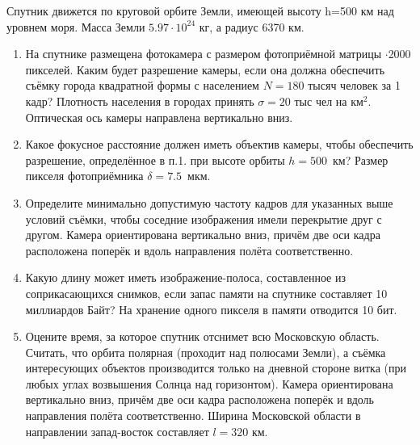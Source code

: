 
Спутник движется по круговой орбите Земли, имеющей высоту h=500 км над уровнем моря. Масса Земли 
$5.97 \cdot 10^{24}$ кг, а радиус 6370 км.

\begin{enumerate}
    \item На спутнике размещена фотокамера с размером фотоприёмной матрицы $\cdot$2000 пикселей. Каким будет 
    разрешение камеры, если она должна обеспечить съёмку города квадратной формы с населением $N=180$ тысяч 
    человек  за 1 кадр? Плотность населения в городах принять $\sigma=20$ тыс чел на км$^2$. Оптическая ось 
    камеры направлена вертикально вниз.
    \item Какое фокусное расстояние должен иметь объектив камеры, чтобы обеспечить разрешение, определённое в п.1. 
    при высоте орбиты  $h=500$~км? Размер пикселя фотоприёмника $\delta=7.5$~мкм.
    \item Определите минимально допустимую частоту кадров для указанных выше условий съёмки, чтобы соседние 
    изображения имели перекрытие друг с другом. Камера ориентирована вертикально вниз, причём две оси кадра 
    расположена поперёк и вдоль направления полёта соответственно.
    \item Какую длину может иметь изображение-полоса, составленное из соприкасающихся снимков, если запас 
    памяти на спутнике составляет 10 миллиардов Байт?  На хранение одного пикселя в памяти отводится 10 бит.
    \item Оцените время, за которое спутник отснимет всю Московскую область. Считать, что орбита полярная 
    (проходит над полюсами Земли), а съёмка интересующих объектов производится только на дневной стороне витка 
    (при любых углах возвышения Солнца над горизонтом). Камера ориентирована вертикально вниз, причём две оси 
    кадра расположена поперёк и вдоль направления полёта соответственно. Ширина Московской области в направлении 
    запад-восток составляет $l=320$ км.
\end{enumerate}